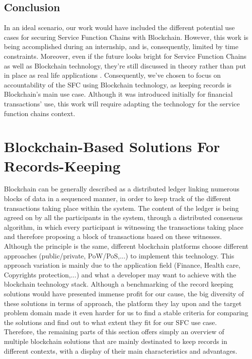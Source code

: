 \subsection{Conclusion}
In an ideal scenario, our work would have included the different potential use cases for securing Service Function Chains with Blockchain. However, this work is being accomplished during an internship, and is, consequently, limited by time constraints. Moreover, even if the future looks bright for Service Function Chains as well as Blockchain technology, they're still discussed in theory rather than put in place as real life applications \cite{sfc} \cite{btc}. Consequently, we've chosen to focus on accountability of the SFC using Blockchain technology, as keeping records is Blockchain's main use case. Although it was introduced initially for financial transactions' use, this work will require adapting the technology for the service function chains context.
\newpage
\section{Blockchain-Based Solutions For Records-Keeping}
Blockchain can be generally described as a distributed ledger linking numerous blocks of data in a sequenced manner, in order to keep track of the different transactions taking place within the system. The content of the ledger is being agreed on by all the participants in the system, through a distributed consensus algorithm, in which every participant is witnessing the transactions taking place and therefore proposing a block of transactions based on these witnesses. Although the principle is the same, different blockchain platforms choose different approaches (public/private, PoW/PoS,...) to implement this technology. This approach variation is mainly due to the application field (Finance, Health care, Copyrights protection,...) and what a developer may want to achieve with the blockchain technology stack. Although a benchmarking of the record keeping solutions would have presented immense profit for our cause, the big diversity of these solutions in terms of approach, the platform they lay upon and the target problem domain made it even harder for us to find a stable criteria for comparing the solutions and find out to what extent they fit for our SFC use case. Therefore, the remaining parts of this section offers simply an overview of multiple blockchain solutions that are mainly destinated to keep records in different contexts, with a display of their main characteristics and advantages.  
